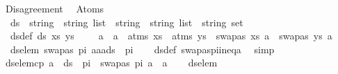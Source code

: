 %
\begin{isabellebody}%
%
%
\isadelimtheory
\isanewline
%
\endisadelimtheory
%
\isatagtheory
{}\isamarkupfalse%
\ Disagreement\ \isanewline
\isanewline
{}\ Atoms\isanewline
\isanewline
{}%
\endisatagtheory
{\isafoldtheory}%
%
\isadelimtheory
\isanewline
%
\endisadelimtheory
\isanewline
\isanewline
\isanewline
{}\isamarkupfalse%
\ \ ds\ {\isacharcolon}{\kern0pt}{\isacharcolon}{\kern0pt}\ {\isachardoublequoteopen}{\isacharparenleft}{\kern0pt}string\ {\isasymtimes}\ string{\isacharparenright}{\kern0pt}\ list\ {\isasymRightarrow}\ {\isacharparenleft}{\kern0pt}string\ {\isasymtimes}\ string{\isacharparenright}{\kern0pt}\ list\ {\isasymRightarrow}\ string\ set{\isachardoublequoteclose}\ \isanewline
\ \ ds{\isacharunderscore}{\kern0pt}def{\isacharcolon}{\kern0pt}\ {\isachardoublequoteopen}ds\ xs\ ys\ \ {\isasymequiv}\ \ {\isacharbraceleft}{\kern0pt}\ a\ {\isachardot}{\kern0pt}\ a\ {\isasymin}\ {\isacharparenleft}{\kern0pt}atms\ xs\ {\isasymunion}\ atms\ ys{\isacharparenright}{\kern0pt}\ {\isasymand}\ {\isacharparenleft}{\kern0pt}swapas\ xs\ a\ {\isasymnoteq}\ swapas\ ys\ a{\isacharparenright}{\kern0pt}\ {\isacharbraceright}{\kern0pt}{\isachardoublequoteclose}\isanewline
\isanewline
\isanewline
\isanewline
{}\isamarkupfalse%
\ \isanewline
\ \ ds{\isacharunderscore}{\kern0pt}elem{\isacharcolon}{\kern0pt}\ {\isachardoublequoteopen}{\isasymlbrakk}swapas\ pi\ a{\isasymnoteq}a{\isasymrbrakk}{\isasymLongrightarrow}a{\isasymin}ds\ {\isacharbrackleft}{\kern0pt}{\isacharbrackright}{\kern0pt}\ pi{\isachardoublequoteclose}\isanewline
%
\isadelimproof
\ \ %
\endisadelimproof
%
\isatagproof
{}\isamarkupfalse%
\ ds{\isacharunderscore}{\kern0pt}def\ swapas{\isacharunderscore}{\kern0pt}pi{\isacharunderscore}{\kern0pt}ineq{\isacharunderscore}{\kern0pt}a\ \isamarkupfalse%
\ simp%
\endisatagproof
{\isafoldproof}%
%
\isadelimproof
\isanewline
%
\endisadelimproof
\isanewline
\isanewline
{}\isamarkupfalse%
\ ds{\isacharunderscore}{\kern0pt}elem{\isacharunderscore}{\kern0pt}cp{\isacharcolon}{\kern0pt}\ {\isachardoublequoteopen}a\ {\isasymnotin}\ ds\ {\isacharbrackleft}{\kern0pt}{\isacharbrackright}{\kern0pt}\ pi\ {\isasymLongrightarrow}\ swapas\ pi\ a\ {\isacharequal}{\kern0pt}\ a{\isachardoublequoteclose}\isanewline
%
\isadelimproof
\ \ %
\endisadelimproof
%
\isatagproof
{}\isamarkupfalse%
\ ds{\isacharunderscore}{\kern0pt}elem\ \isamarkupfalse%

\end{isabellebody}
